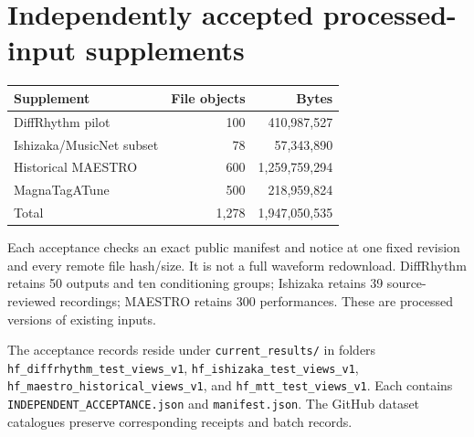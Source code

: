 \documentclass[11pt]{article}
\begin{document}
\section{Independently accepted processed-input supplements}
\begin{center}
\begin{tabular}{lrr}
\toprule
Supplement & File objects & Bytes \\
\midrule
DiffRhythm pilot & 100 & 410,987,527 \\
Ishizaka/MusicNet subset & 78 & 57,343,890 \\
Historical MAESTRO & 600 & 1,259,759,294 \\
MagnaTagATune & 500 & 218,959,824 \\
\midrule
Total & 1,278 & 1,947,050,535 \\
\bottomrule
\end{tabular}
\end{center}
Each acceptance checks an exact public manifest and notice at one fixed
revision and every remote file hash/size. It is not a full waveform
redownload. DiffRhythm retains 50 outputs and ten conditioning groups;
Ishizaka retains 39 source-reviewed recordings; MAESTRO retains 300
performances. These are processed versions of existing inputs.

The acceptance records reside under \texttt{current\_results/} in folders
\nolinkurl{hf_diffrhythm_test_views_v1},
\nolinkurl{hf_ishizaka_test_views_v1},
\nolinkurl{hf_maestro_historical_views_v1}, and
\nolinkurl{hf_mtt_test_views_v1}. Each contains
\nolinkurl{INDEPENDENT_ACCEPTANCE.json} and \nolinkurl{manifest.json}.
The GitHub dataset catalogues preserve corresponding receipts and batch records.
\end{document}
